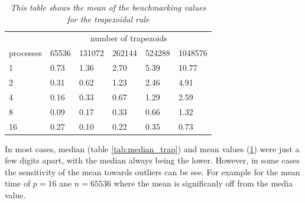 \documentclass[a4paper,11pt,twoside]{article}
\begin{document}
\begin{table}[]
\centering
\caption{\textit{This table shows the mean of the benchmarking values for the trapezoidal rule}}
\label{tab:mean_trap}
\begin{tabular}{llllll}
\multicolumn{1}{l|}{}          & \multicolumn{5}{c}{number of trapezoids}                                                                                       \\ \cline{2-6} 
\multicolumn{1}{l|}{processes} & \multicolumn{1}{l|}{65536} & \multicolumn{1}{l|}{131072} & \multicolumn{1}{l|}{262144} & \multicolumn{1}{l|}{524288} & 1048576 \\ \hline
1                              & 0.73                       & 1.36                        & 2.70                        & 5.39                        & 10.77   \\
2                              & 0.31                       & 0.62                        & 1.23                        & 2.46                        & 4.91    \\
4                              & 0.16                       & 0.33                        & 0.67                        & 1.29                        & 2.59    \\
8                              & 0.09                       & 0.17                        & 0.33                        & 0.66                        & 1.32    \\
16                             & 0.27                       & 0.10                        & 0.22                        & 0.35                        & 0.73   
\end{tabular}
\end{table}

In most cases, median (table \ref{tab:median_trap}) and mean values (\ref{tab:mean_trap}) were just a few digits apart, with the median always being the lower. However, in some cases the sensitivity of the mean towards outliers can be see. For example for the mean time of $p = 16$ ane $n = 65536$ where the mean is significanly off from the media value. 
\end{document}
